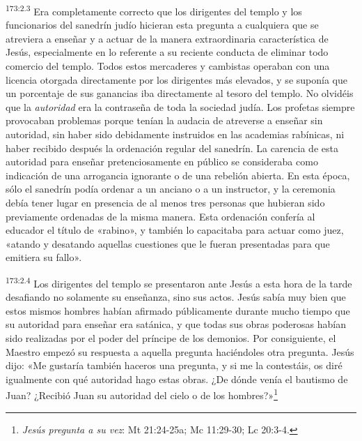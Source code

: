 \par 
\textsuperscript{173:2.3} Era completamente correcto que los dirigentes del templo y los funcionarios del sanedrín judío hicieran esta pregunta a cualquiera que se atreviera a enseñar y a actuar de la manera extraordinaria característica de Jesús, especialmente en lo referente a su reciente conducta de eliminar todo comercio del templo. Todos estos mercaderes y cambistas operaban con una licencia otorgada directamente por los dirigentes más elevados, y se suponía que un porcentaje de sus ganancias iba directamente al tesoro del templo. No olvidéis que la \textit{autoridad} era la contraseña de toda la sociedad judía. Los profetas siempre provocaban problemas porque tenían la audacia de atreverse a enseñar sin autoridad, sin haber sido debidamente instruidos en las academias rabínicas, ni haber recibido después la ordenación regular del sanedrín. La carencia de esta autoridad para enseñar pretenciosamente en público se consideraba como indicación de una arrogancia ignorante o de una rebelión abierta. En esta época, sólo el sanedrín podía ordenar a un anciano o a un instructor, y la ceremonia debía tener lugar en presencia de al menos tres personas que hubieran sido previamente ordenadas de la misma manera. Esta ordenación confería al educador el título de «rabino», y también lo capacitaba para actuar como juez, «atando y desatando aquellas cuestiones que le fueran presentadas para que emitiera su fallo».

\par 
\textsuperscript{173:2.4} Los dirigentes del templo se presentaron ante Jesús a esta hora de la tarde desafiando no solamente su enseñanza, sino sus actos. Jesús sabía muy bien que estos mismos hombres habían afirmado públicamente durante mucho tiempo que su autoridad para enseñar era satánica, y que todas sus obras poderosas habían sido realizadas por el poder del príncipe de los demonios. Por consiguiente, el Maestro empezó su respuesta a aquella pregunta haciéndoles otra pregunta. Jesús dijo: «Me gustaría también haceros una pregunta, y si me la contestáis, os diré igualmente con qué autoridad hago estas obras. ¿De dónde venía el bautismo de Juan? ¿Recibió Juan su autoridad del cielo o de los hombres?»\footnote{\textit{Jesús pregunta a su vez}: Mt 21:24-25a; Mc 11:29-30; Lc 20:3-4.}

